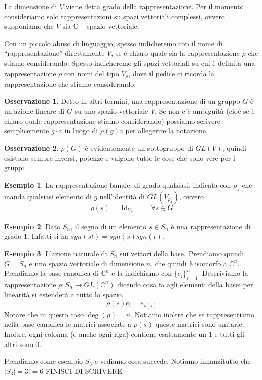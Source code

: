 \documentclass[11pt]{article}
\theoremstyle{plain}
\theoremstyle{definition}
\newtheorem{exmp}{Esempio}[section]
\newtheorem*{rem}{Osservazione}
\theoremstyle{remark}
\newcommand{\C}{\mathbb{C}}
\DeclareMathOperator{\Id}{Id}
\begin{document}
La dimensione di $V$ viene detta grado della rappresentazione.
Per il momento consideriamo solo rappresentazioni su spazi vettoriali complessi, ovvero supponiamo che $V$ sia $\C-$spazio vettoriale.

Con un piccolo abuso di linguaggio, spesso indicheremo con il nome di ``rappresentazione'' direttamente $V$, se è chiaro quale sia
la rappresentazione $\rho$ che stiamo considerando. Spesso indicheremo gli spazi vettoriali
su cui è definita una rappresentazione $\rho$ con nomi del tipo $V_\rho$, dove il pedice ci ricorda la rappresentazione che stiamo considerando.

\begin{rem}
Detto in altri termini, una rappresentazione di un gruppo $G$ è un'azione lineare di $G$ su uno spazio vettoriale $V$.
Se non c'è ambiguità (cioè se è chiaro quale rappresentazione stiamo considerando)
possiamo scrivere semplicemente $g\cdot v$ in luogo di $\rho(g)v$ per allegerire la notazione.
\end{rem}

\begin{rem}
$\rho(G)$ è evidentemente un sottogruppo di $GL(V)$, quindi esistono sempre inversi, potenze e valgono tutte le cose che sono vere per i gruppi.
\end{rem}


\begin{exmp}
   La rappresentazione banale, di grado qualsiasi, indicata con $\rho_1$ che manda qualsiasi elemento di $g$ nell'identità di $GL(V_{\rho_1})$, ovvero
	\[ \rho(s ) = \Id_{V_{\rho_1}} \qquad \forall s \in G\]
\end{exmp}
\begin{exmp}
   Dato $S_n$, il segno di un elemento $s\in S_n$ è una rappresentazione di grado 1. Infatti si ha $sgn(st) = sgn(s) sgn(t)$.
\end{exmp}
\begin{exmp}
   L'azione naturale di $S_n$ sui vettori della base. Prendiamo quindi $G = S_n$ e uno spazio vettoriale di dimensione $n$, che quindi è isomorfo a $\C^n$. Prendiamo la base canonica di $\C^n$ e la indichiamo con $\{e_i\}_{i=1}^n$. Descriviamo la rappresentazione $\rho: S_n \to GL(\C^n)$ dicendo cosa fa agli elementi della base: per linearità si estenderà a tutto lo spazio.
	\[ \rho(s) e_i = e_{s(i)}\]
	Notare che in questo caso $\deg(\rho) = n$. Notiamo inoltre che se rappresentiamo nella base canonica le matrici associate a $\rho(s)$ queste matrici sono unitarie. Inoltre, ogni colonna (e anche ogni riga) contiene esattamente un 1 e tutti gli altri sono 0.

	Prendiamo come esempio $S_3$ e vediamo cosa succede. Notiamo innanzitutto che $ |S_3| = 3! = 6$
	FINISCI DI SCRIVERE
\end{exmp}
\end{document}
